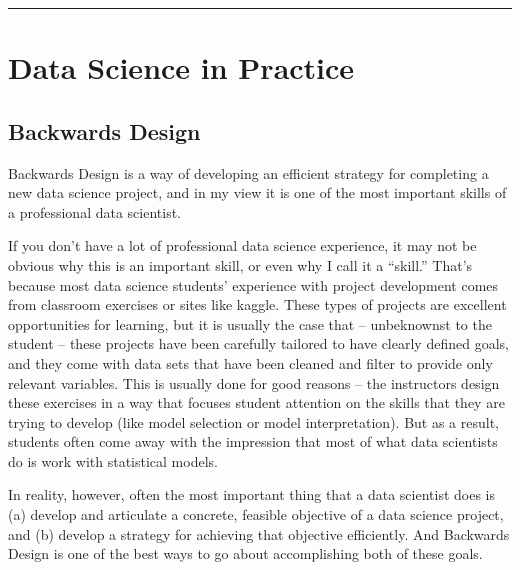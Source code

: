 \documentclass[letterpaper,10pt,english]{jupyterBook}
\begin{document}
\bigskip\hrule\bigskip


\sphinxstepscope


\part{Data Science in Practice}

\sphinxstepscope


\chapter{Backwards Design}
\label{\detokenize{40_in_practice/00_backwards_design:backwards-design}}\label{\detokenize{40_in_practice/00_backwards_design::doc}}
\sphinxAtStartPar
Backwards Design is a way of developing an efficient strategy for completing a new data science project, and in my view it is one of the most important skills of a professional data scientist.

\sphinxAtStartPar
If you don’t have a lot of professional data science experience, it may not be obvious why this is an important skill, or even why I call it a “skill.” That’s because most data science students’ experience with project development comes from classroom exercises or sites like kaggle. These types of projects are excellent opportunities for learning, but it is usually the case that – unbeknownst to the student – these projects have been carefully tailored to have clearly defined goals, and they come with data sets that have been cleaned and filter to provide only relevant variables. This is usually done for good reasons – the instructors design these exercises in a way that focuses student attention on the skills that they are trying to develop (like model selection or model interpretation). But as a result, students often come away with the impression that most of what data scientists do is work with statistical models.

\sphinxAtStartPar
In reality, however, often the most important thing that a data scientist does is (a) develop and articulate a concrete, feasible objective of a data science project, and (b) develop a strategy for achieving that objective efficiently. And Backwards Design is one of the best ways to go about accomplishing both of these goals.
\end{document}

